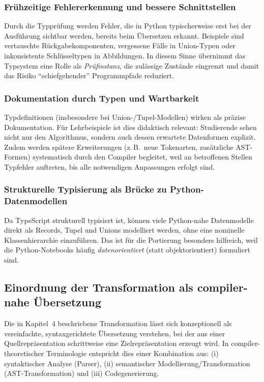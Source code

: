 \subsubsection{Frühzeitige Fehlererkennung und bessere Schnittstellen}
Durch die Typprüfung werden Fehler, die in Python typischerweise erst bei der Ausführung sichtbar werden, bereits beim Übersetzen erkannt. Beispiele sind vertauschte Rückgabekomponenten, vergessene Fälle in Union-Typen oder inkonsistente Schlüsseltypen in Abbildungen. In diesem Sinne übernimmt das Typsystem eine Rolle als \emph{Prüfinstanz}, die zulässige Zustände eingrenzt und damit das Risiko ``schiefgehender'' Programmpfade reduziert. \autocite[S.1ff]{pierce2002tapl}

\subsubsection{Dokumentation durch Typen und Wartbarkeit}
Typdefinitionen (insbesondere bei Union-/Tupel-Modellen) wirken als präzise Dokumentation. Für Lehrbeispiele ist dies didaktisch relevant: Studierende sehen nicht nur den Algorithmus, sondern auch dessen erwartete Datenformen explizit. Zudem werden spätere Erweiterungen (z.\,B.\ neue Tokenarten, zusätzliche AST-Formen) systematisch durch den Compiler begleitet, weil an betroffenen Stellen Typfehler auftreten, bis alle notwendigen Anpassungen erfolgt sind. \autocite[S.44ff]{vanderkam2019effective}

\subsubsection{Strukturelle Typisierung als Brücke zu Python-Datenmodellen}
Da TypeScript strukturell typisiert ist, können viele Python-nahe Datenmodelle direkt als Records, Tupel und Unions modelliert werden, ohne eine nominelle Klassenhierarchie einzuführen. Das ist für die Portierung besonders hilfreich, weil die Python-Notebooks häufig \emph{datenorientiert} (statt objektorientiert) formuliert sind. \autocite[S.44ff]{vanderkam2019effective}

\subsection{Einordnung der Transformation als compiler-nahe Übersetzung}
Die in Kapitel~4 beschriebene Transformation lässt sich konzeptionell als vereinfachte, syntaxgerichtete Übersetzung verstehen, bei der aus einer Quellrepräsentation schrittweise eine Zielrepräsentation erzeugt wird. In compiler-theoretischer Terminologie entspricht dies einer Kombination aus:
(i) syntaktischer Analyse (Parser), (ii) semantischer Modellierung/Transformation (AST-Transformation) und (iii) Codegenerierung. \autocite[S.304ff]{aho2006compilers}


